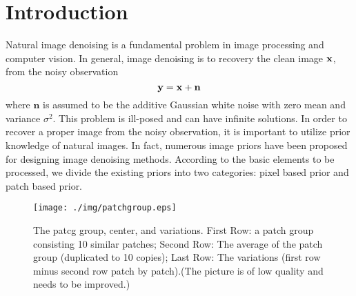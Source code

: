 \documentclass[10pt,twocolumn,letterpaper]{article}
\begin{document}
\section{Introduction}
Natural image denoising is a fundamental problem in image processing and computer vision. In general, image denoising is to recovery the clean image $\bf{x}$, from the noisy observation 
\begin{equation}
\bf{y} = \bf{x} + n
\end{equation}
where $\mathbf{n}$ is assumed to be the additive Gaussian white noise with zero mean and variance $\sigma^{2}$. This problem is ill-posed and can have infinite solutions. In order to recover a proper image from the noisy observation, it is important to utilize prior knowledge of natural images\cite{levin2012patch}. In fact, numerous image priors have been proposed for designing image denoising methods. According to the basic elements to be processed, we divide the existing priors into two categories: pixel based prior and patch based prior. 
\begin{figure}[t]\label{fig1}
\begin{center}
   \texttt{[image: ./img/patchgroup.eps]}
\end{center}
   \caption{The patcg group, center, and variations. First Row: a patch group consisting 10 similar patches; Second Row: The average of the patch group (duplicated to 10 copies); Last Row: The variations (first row minus second row patch by patch).(The picture is of low quality and needs to be improved.)}
\label{fig:long}
\label{fig:onecol}
\end{figure}
\end{document}

